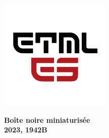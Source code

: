 \onecolumn

\begin{figure}
	\begin{minipage}{0.47\textwidth}
		\centering
		\includegraphics[width=.4\textwidth,left,]{./ETML-ES-LOGO.png}
	\end{minipage}
	
	\hfill
	\begin{minipage}{0.7\textwidth}
		\raggedleft
		\LARGE \textbf{Boîte noire miniaturisée\\ 2023, 1942B}
	\end{minipage}
\end{figure}


